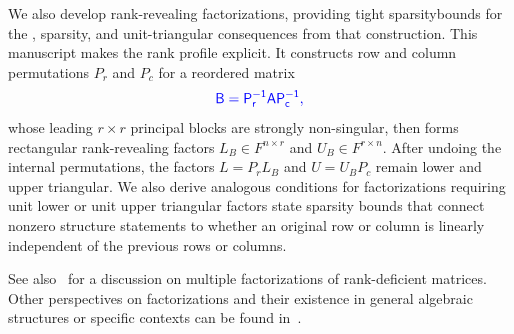\documentclass[10pt,twoside]{siamart1116}
\numberwithin{theorem}{section}
\providecommand{\DIFadd}[1]{{\protect\color{blue} \sf #1}} %
\providecommand{\DIFdel}[1]{{\protect\color{red} \scriptsize #1}} %
\providecommand{\DIFaddbegin}{} %
\providecommand{\DIFaddend}{} %
\providecommand{\DIFdelbegin}{} %
\providecommand{\DIFdelend}{} %
\begin{document}
\DIFadd{We also develop }\DIFaddend rank-revealing\DIFdelbegin \DIFdel{factorizations, providing tight sparsitybounds for the }\DIFdelend \DIFaddbegin \DIFadd{, sparsity, and unit-triangular consequences from that construction. This manuscript makes the rank profile explicit. It constructs row and column permutations \(P_r\) and \(P_c\) for a reordered matrix
}\[
  \DIFadd{B=P_r^{-1}AP_c^{-1},
}\]
\DIFadd{whose leading \(r \times r\) principal blocks are strongly non-singular, then forms rectangular rank-revealing }\DIFaddend factors \DIFaddbegin \DIFadd{\(L_B\in F^{n\times r}\) and \(U_B\in F^{r\times n}\).  After undoing the internal permutations, the factors \(L=P_rL_B\) and \(U=U_BP_c\) remain lower and upper triangular}\DIFaddend . We also \DIFdelbegin \DIFdel{derive analogous conditions for factorizations requiring unit lower or unit upper triangular factors}\DIFdelend \DIFaddbegin \DIFadd{state sparsity bounds that connect nonzero structure statements to whether an original row or column is linearly independent of the previous rows or columns.
}

\DIFadd{See also~\cite{dopico_multiple_2006} for a discussion on multiple factorizations of rank-deficient matrices. Other perspectives on factorizations and their existence in general algebraic structures or specific contexts can be found in~\cite{nagarajan_products_1999,johnson_inherited_1989,jeffrey_lu_2010,higham_gaussian_2011}}\DIFaddend .
\end{document}
